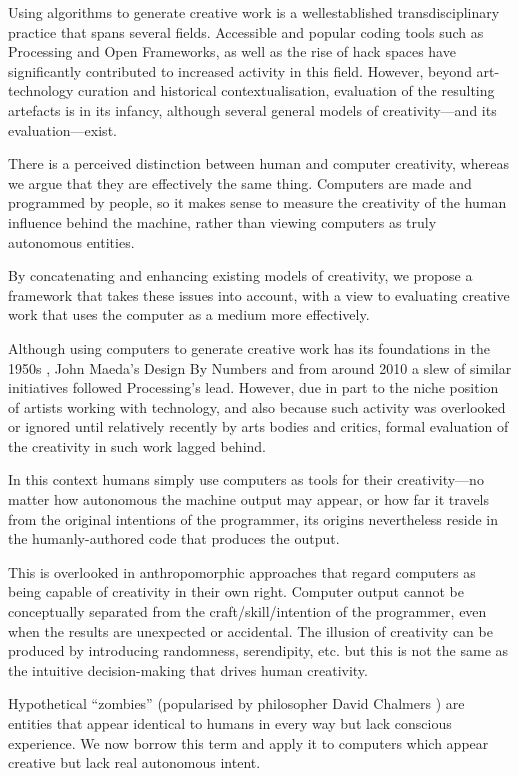 \begin{leftbar}
Using algorithms to generate creative work is a wellestablished transdisciplinary practice that spans several fields. Accessible and popular coding tools such as Processing and Open Frameworks, as well as the rise of hack spaces have significantly contributed to increased activity in this field. However, beyond art-technology curation and historical contextualisation, evaluation of the resulting artefacts is in its infancy, although several general models of creativity---and its evaluation---exist.

There is a perceived distinction between human and computer creativity, whereas we argue that they are effectively the same thing. Computers are made and programmed by people, so it makes sense to measure the creativity of the human influence behind the machine, rather than viewing computers as truly autonomous entities.

By concatenating and enhancing existing models of creativity, we propose a framework that takes these issues into account, with a view to evaluating creative work that uses the computer as a medium more effectively.

Although using computers to generate creative work has its foundations in the 1950s \autocite{Candy2011}, John Maeda's Design By Numbers \autocite{Maeda2001} and from around 2010 a slew of similar initiatives followed Processing's lead. However, due in part to the niche position of artists working with technology, and also because such activity was overlooked or ignored until relatively recently by arts bodies and critics, formal evaluation of the creativity in such work lagged behind.

In this context humans simply use computers as tools for their creativity---no matter how autonomous the machine output may appear, or how far it travels from the original intentions of the programmer, its origins nevertheless reside in the humanly-authored code that produces the output.

This is overlooked in anthropomorphic approaches that regard computers as being capable of creativity in their own right. Computer output cannot be conceptually separated from the craft/skill/intention of the programmer, even when the results are unexpected or accidental. The illusion of creativity can be produced by introducing randomness, serendipity, etc. but this is not the same as the intuitive decision-making that drives human creativity.

Hypothetical ``zombies'' (popularised by philosopher David Chalmers \autocite{Chalmers1996}) are entities that appear identical to humans in every way but lack conscious experience. We now borrow this term and apply it to computers which appear creative but lack real autonomous intent.


\end{leftbar}
